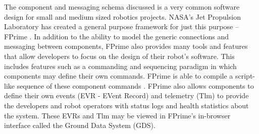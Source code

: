 \documentclass{article}
\begin{document}
The component and messaging schema discussed is a very common software design for small and medium sized robotics projects. NASA's Jet Propulsion Laboratory has created a general purpose framework for just this purpose -- FPrime \cite{b4}. In addition to the ability to model the generic connections and messaging between components, FPrime also provides many tools and features that allow developers to focus on the design of their robot's software. This includes features such as a commanding and sequencing paradigm in which components may define their own commands. FPrime is able to compile a script-like sequence of these component commands \cite{b4}. FPrime also allows components to define their own events (EVR - EVent Record) and telemetry (Tlm) to provide the developers and robot operators with status logs and health statistics about the system. These EVRs and Tlm may be viewed in FPrime's in-browser interface called the Ground Data System (GDS).

\end{document}
